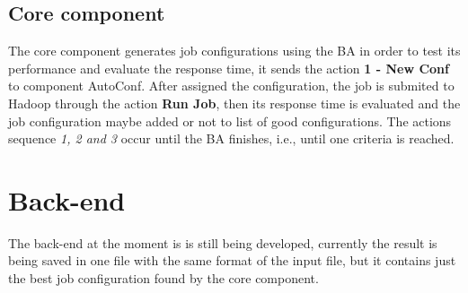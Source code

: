 \subsection{Core component}

The core component generates job configurations using the BA in order to test its performance
and evaluate the response time, it sends the action {\bf 1 - New Conf} to component AutoConf.
After assigned the configuration, the job is submited to Hadoop through the action {\bf Run Job},
then its response time is evaluated and the job configuration maybe added or not to list of good
configurations. The actions sequence {\it 1, 2 and 3} occur until the BA finishes,
i.e., until one criteria is reached.

\section{Back-end}

The back-end at the moment is is still being developed, currently the result is being saved in
one file with the same format of the input file, but it contains just the best
job configuration found by the core component.
